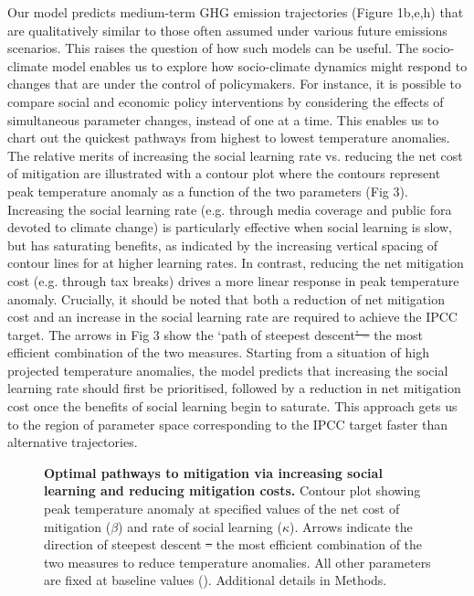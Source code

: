 \documentclass[10pt,letterpaper]{article}
\providecommand{\DIFaddtex}[1]{{\protect\color{blue}\uwave{#1}}} %
\providecommand{\DIFdeltex}[1]{{\protect\color{red}\sout{#1}}}                      %
\providecommand{\DIFaddbegin}{} %
\providecommand{\DIFaddend}{} %
\providecommand{\DIFdelbegin}{} %
\providecommand{\DIFdelend}{} %
\providecommand{\DIFaddFL}[1]{\DIFadd{#1}} %
\providecommand{\DIFdelFL}[1]{\DIFdel{#1}} %
\providecommand{\DIFaddbeginFL}{} %
\providecommand{\DIFaddendFL}{} %
\providecommand{\DIFdelbeginFL}{} %
\providecommand{\DIFdelendFL}{} %
\providecommand{\DIFadd}[1]{\texorpdfstring{\DIFaddtex{#1}}{#1}} %
\providecommand{\DIFdel}[1]{\texorpdfstring{\DIFdeltex{#1}}{}} %
\begin{document}
Our model predicts medium-term GHG emission trajectories (Figure 1b,e,h) that are qualitatively similar to those often assumed under various future emissions scenarios. This raises the question of how such models can be useful. The socio-climate model enables us to explore how socio-climate dynamics might respond to changes that are under the control of policymakers. For instance, it is possible to compare social and economic policy interventions by considering the effects of simultaneous parameter changes, instead of one at a time. This enables us to chart out the quickest pathways from highest to lowest temperature anomalies. The relative merits of increasing the social learning rate vs. reducing the net cost of mitigation are illustrated with a contour plot where the contours represent peak temperature anomaly as a function of the two parameters (Fig 3). Increasing the social learning rate (e.g. through media coverage and public fora devoted to climate change) is particularly effective when social learning is slow, but has saturating benefits, as indicated by the increasing vertical spacing of contour lines for at higher learning rates. In contrast, reducing the net mitigation cost (e.g. through tax breaks) drives a more linear response in peak temperature anomaly. Crucially, it should be noted that both a reduction of net mitigation cost and an increase in the social learning rate are required to achieve the IPCC target. The arrows in Fig 3 show the `path of steepest descent\DIFdelbegin \DIFdel{’ – }\DIFdelend \DIFaddbegin \DIFadd{? ? }\DIFaddend the most efficient combination of the two measures. Starting from a situation of high projected temperature anomalies, the model predicts that increasing the social learning rate should first be prioritised, followed by a reduction in net mitigation cost once the benefits of social learning begin to saturate. This approach gets us to the region of parameter space corresponding to the IPCC target faster than alternative trajectories.


\begin{figure}[!ht]
\caption{{\bf Optimal pathways to mitigation via increasing social learning and reducing mitigation costs.}
Contour plot showing peak temperature anomaly at specified values of the net cost of mitigation ($\beta$) and rate of social learning ($\kappa$). Arrows indicate the direction of steepest descent \DIFdelbeginFL \DIFdelFL{– }\DIFdelendFL \DIFaddbeginFL \DIFaddFL{? }\DIFaddendFL the most efficient combination of the two measures to reduce temperature anomalies. All other parameters are fixed at baseline values (). Additional details in Methods.}
\label{fig3}
\end{figure}
\end{document}
